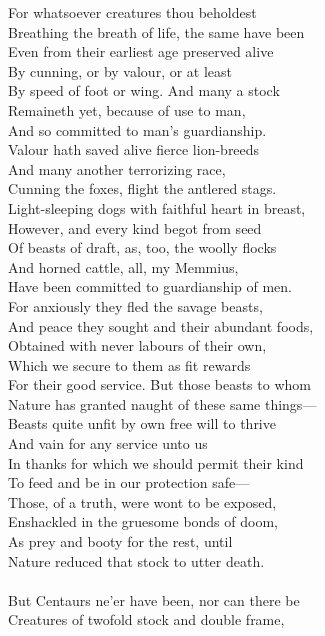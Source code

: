 For whatsoever creatures thou beholdest\\
Breathing the breath of life, the same have been\\
Even from their earliest age preserved alive\\
By cunning, or by valour, or at least\\
By speed of foot or wing. And many a stock\\
Remaineth yet, because of use to man,\\
And so committed to man's guardianship.\\
Valour hath saved alive fierce lion-breeds\\
And many another terrorizing race,\\
Cunning the foxes, flight the antlered stags.\\
Light-sleeping dogs with faithful heart in breast,\\
However, and every kind begot from seed\\
Of beasts of draft, as, too, the woolly flocks\\
And horned cattle, all, my Memmius,\\
Have been committed to guardianship of men.\\
For anxiously they fled the savage beasts,\\
And peace they sought and their abundant foods,\\
Obtained with never labours of their own,\\
Which we secure to them as fit rewards\\
For their good service. But those beasts to whom\\
Nature has granted naught of these same things—\\
Beasts quite unfit by own free will to thrive\\
And vain for any service unto us\\
In thanks for which we should permit their kind\\
To feed and be in our protection safe—\\
Those, of a truth, were wont to be exposed,\\
Enshackled in the gruesome bonds of doom,\\
As prey and booty for the rest, until\\
Nature reduced that stock to utter death.\\
\\
But Centaurs ne'er have been, nor can there be\\
Creatures of twofold stock and double frame,\\
